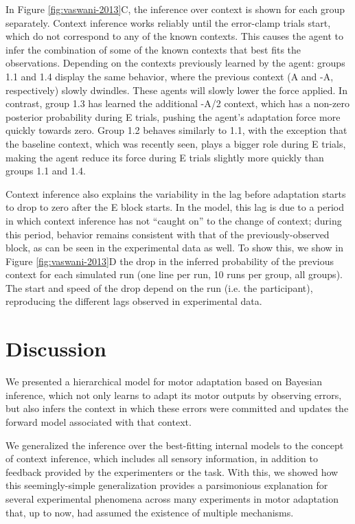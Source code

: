 \documentclass[a4paper,doc,floatsintext,natbib]{apa6}%
\def \fref #1{Figure \ref{#1}}     %
\begin{document}
In \fref{fig:vaswani-2013}C, the inference over context is shown for each group separately. Context inference works reliably until the error-clamp trials start, which do not correspond to any of the known contexts. This causes the agent to infer the combination of some of the known contexts that best fits the observations. Depending on the contexts previously learned by the agent: groups 1.1 and 1.4 display the same behavior, where the previous context (A and -A, respectively) slowly dwindles. These agents will slowly lower the force applied. In contrast, group 1.3 has learned the additional -A/2 context, which has a non-zero posterior probability during E trials, pushing the agent's adaptation force more quickly towards zero. Group 1.2 behaves similarly to 1.1, with the exception that the baseline context, which was recently seen, plays a bigger role during E trials, making the agent reduce its force during E trials slightly more quickly than groups 1.1 and 1.4.

Context inference also explains the variability in the lag before adaptation starts to drop to zero after the E block starts. In the model, this lag is due to a period in which context inference has not ``caught on'' to the change of context; during this period, behavior remains consistent with that of the previously-observed block, as can be seen in the experimental data as well. To show this, we show in \fref{fig:vaswani-2013}D the drop in the inferred probability of the previous context for each simulated run (one line per run, 10 runs per group, all groups). The start and speed of the drop depend on the run (i.e. the participant), reproducing the different lags observed in experimental data.

\section{Discussion}
We presented a hierarchical model for motor adaptation based on Bayesian inference, which not only learns to adapt its motor outputs by observing errors, but also infers the context in which these errors were committed and updates the forward model associated with that context.

We generalized the inference over the best-fitting internal models to the concept of context inference, which includes all sensory information, in addition to feedback provided by the experimenters or the task. With this, we showed how this seemingly-simple generalization provides a parsimonious explanation for several experimental phenomena across many experiments in motor adaptation that, up to now, had assumed the existence of multiple mechanisms.
\end{document}
